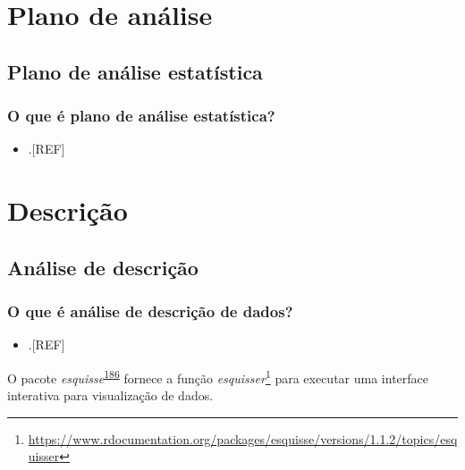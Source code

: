 \documentclass[
  a4paper,
]{book}
\providecommand{\tightlist}{%
  \setlength{\itemsep}{0pt}\setlength{\parskip}{0pt}}
\renewcommand{\href}[2]{#2\footnote{\url{#1}}}
\newenvironment{infobox}[1]
  {
  \begin{itemize}
  \renewcommand{\labelitemi}{
    \raisebox{-.7\height}[0pt][0pt]{
      {\setkeys{Gin}{width=3em,keepaspectratio}
        \texttt{[image: \#1]}}
    }
  }
  \setlength{\fboxsep}{1em}
  \begin{blackbox}
  \item
  }
  {
  \end{blackbox}
  \end{itemize}
  }
\begin{document}
\hypertarget{plano-analise}{%
\chapter{\texorpdfstring{\textbf{Plano de análise}}{Plano de análise}}\label{plano-analise}}

\hypertarget{plano-analise-estatistica}{%
\section{Plano de análise estatística}\label{plano-analise-estatistica}}

\hypertarget{o-que-uxe9-plano-de-anuxe1lise-estatuxedstica}{%
\subsection{O que é plano de análise estatística?}\label{o-que-uxe9-plano-de-anuxe1lise-estatuxedstica}}

\begin{itemize}
\tightlist
\item
  .{[}REF{]}
\end{itemize}

\hypertarget{analise-descricao}{%
\chapter{\texorpdfstring{\textbf{Descrição}}{Descrição}}\label{analise-descricao}}

\hypertarget{analise-descricao}{%
\section{Análise de descrição}\label{analise-descricao}}

\hypertarget{o-que-uxe9-anuxe1lise-de-descriuxe7uxe3o-de-dados}{%
\subsection{O que é análise de descrição de dados?}\label{o-que-uxe9-anuxe1lise-de-descriuxe7uxe3o-de-dados}}

\begin{itemize}
\tightlist
\item
  .{[}REF{]}
\end{itemize}

\begin{infobox}{images/Rlogo}
O pacote \emph{esquisse}\textsuperscript{\protect\hyperlink{ref-esquisse}{186}} fornece a função \href{https://www.rdocumentation.org/packages/esquisse/versions/1.1.2/topics/esquisser}{\emph{esquisser}} para executar uma interface interativa para visualização de dados.

\end{infobox}
\end{document}
